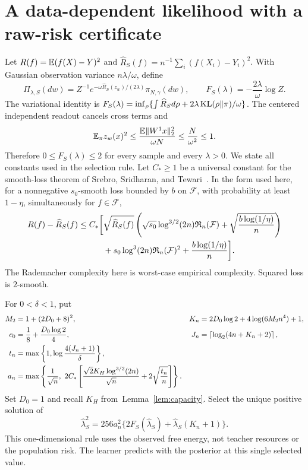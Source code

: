 \section{A data-dependent likelihood with a raw-risk certificate}
Let $R(f)=\mathbb E(f(X)-Y)^2$ and $\widehat R_S(f)=n^{-1}\sum_i(f(X_i)-Y_i)^2$. With Gaussian observation variance $n\lambda/\omega$, define
\[
 \Pi_{\lambda,S}(dw)=Z^{-1}e^{-\omega\widehat R_S(z_w)/(2\lambda)}\pi_{N,\gamma}(dw),\qquad
 F_S(\lambda)=-\frac{2\lambda}{\omega}\log Z.
\]
The variational identity is $F_S(\lambda)=\inf_\rho\{\int\widehat R_Sd\rho+2\lambda\operatorname{KL}(\rho\|\pi)/\omega\}$. The centered independent readout cancels cross terms and
\[
 \mathbb E_\pi z_w(x)^2\le\frac{\mathbb E\|W^1x\|_2^2}{\omega N}
                 \le\frac N{\omega^2}\le1.
\]
Therefore $0\le F_S(\lambda)\le2$ for every sample and every $\lambda>0$.
We state all constants used in the selection rule. Let $C_*\ge1$ be a universal constant for the smooth-loss theorem of Srebro, Sridharan, and Tewari~\cite[Theorem~1]{sst}. In the form used here, for a nonnegative $s_0$-smooth loss bounded by $b$ on $\mathcal F$, with probability at least $1-\eta$, simultaneously for $f\in\mathcal F$,
\begin{align}
 R(f)-\widehat R_S(f)\le C_*\bigg[&\sqrt{\widehat R_S(f)}
 \left(\sqrt{s_0}\log^{3/2}(2n)\mathfrak R_n(\mathcal F)+\sqrt{\frac{b\log(1/\eta)}n}\right)\notag\\
 &+s_0\log^3(2n)\mathfrak R_n(\mathcal F)^2+\frac{b\log(1/\eta)}n\bigg].
 \label{eq:sst}
\end{align}
The Rademacher complexity here is worst-case empirical complexity. Squared loss is $2$-smooth.

For $0<\delta<1$, put
\begin{align}
 M_2&=1+(2D_0+8)^2, & K_n&=2D_0\log2+4\log(6M_2n^4)+1,\notag\\
 c_0&=\frac18+\frac{D_0\log2}{4}, &
 J_n&=\left\lceil\log_2(4n+K_n+2)\right\rceil,\notag\\
 t_n&=\max\left\{1,\log\frac{4(J_n+1)}\delta\right\},\notag\\
 a_n&=\max\left\{\frac1{\sqrt n},\ 2C_*\left[
       \frac{\sqrt2K_H\log^{3/2}(2n)}{\sqrt n}+2\sqrt{\frac{t_n}n}\right]\right\}.
 \label{eq:stat-constants}
\end{align}
Set $D_0=1$ and recall $K_H$ from~Lemma~\ref{lem:capacity}. Select the unique positive solution of
\begin{equation}
 \widehat\lambda_S^2
   =256a_n^2\{2F_S(\widehat\lambda_S)+\widehat\lambda_S(K_n+1)\}.
 \label{eq:calibration}
\end{equation}
This one-dimensional rule uses the observed free energy, not teacher resources or the population risk. The learner predicts with the posterior at this single selected value.

